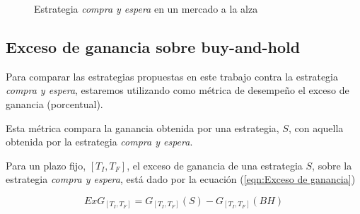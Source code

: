 \documentclass[12pt]{report}
\theoremstyle{break}
\theoremstyle{break}
\begin{document}
\begin{figure}[ht]
\centering
{}
\caption{\label{imagen:buy hold alza} Estrategia \textit{compra y espera} en un mercado a la alza}
\end{figure}

\subsection{Exceso de ganancia sobre buy-and-hold}
\label{subseccion:exceso de ganancia}

Para comparar las estrategias propuestas en este trabajo contra la estrategia \textit{compra y espera}, estaremos utilizando como métrica de desempeño el exceso de ganancia (porcentual).

Esta métrica compara la ganancia obtenida por una estrategia, $S$, con aquella obtenida por la estrategia \textit{compra y espera}.

Para un plazo fijo, $\left[T_{I}, T_{F}\right]$, el exceso de ganancia de una estrategia $S$, sobre la estrategia \textit{compra y espera}, está dado por la ecuación (\ref{eqn:Exceso de ganancia})

\begin{equation} \label{eqn:Exceso de ganancia}
ExG_{\left[T_{I}, T_{F}\right]} = G_{\left[T_{I}, T_{F}\right]} (S) - G_{\left[T_{I}, T_{F}\right]} (BH)
\end{equation}
\end{document}
